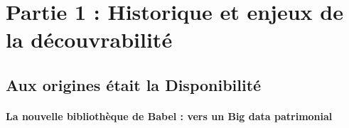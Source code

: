 
\part{Partie 1 : Historique et enjeux de la découvrabilité}
\chapter{Aux origines était la Disponibilité}

\subsection{La nouvelle bibliothèque de Babel : vers un Big data patrimonial}

